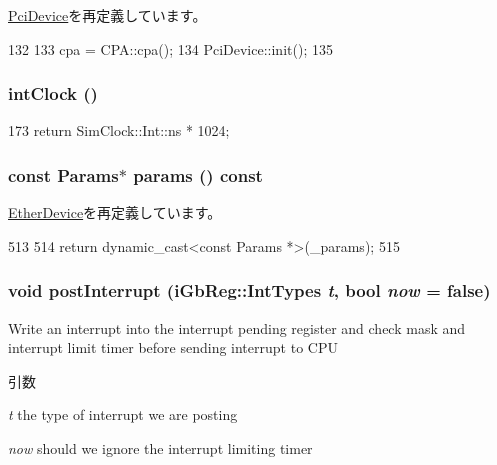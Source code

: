 \hyperlink{classPciDevice_a02fd73d861ef2e4aabb38c0c9ff82947}{PciDevice}を再定義しています。


\begin{DoxyCode}
132 {
133     cpa = CPA::cpa();
134     PciDevice::init();
135 }
\end{DoxyCode}
\hypertarget{classIGbE_ad4b9fb8ece2ddee6cda2b12e4f77b3d1}{
\subsubsection[{intClock}]{ intClock ()}}
\label{classIGbE_ad4b9fb8ece2ddee6cda2b12e4f77b3d1}



\begin{DoxyCode}
173 { return SimClock::Int::ns * 1024; }
\end{DoxyCode}
\hypertarget{classIGbE_acd3c3feb78ae7a8f88fe0f110a718dff}{
\subsubsection[{params}]{\setlength{\rightskip}{0pt plus 5cm}const {\bf Params}$\ast$ params () const}}
\label{classIGbE_acd3c3feb78ae7a8f88fe0f110a718dff}


\hyperlink{classEtherDevice_acd3c3feb78ae7a8f88fe0f110a718dff}{EtherDevice}を再定義しています。


\begin{DoxyCode}
513                    {
514         return dynamic_cast<const Params *>(_params);
515     }
\end{DoxyCode}
\hypertarget{classIGbE_a5421bafb8503ffca04cac20d616ae4cc}{
\subsubsection[{postInterrupt}]{\setlength{\rightskip}{0pt plus 5cm}void postInterrupt ({\bf iGbReg::IntTypes} {\em t}, \/  bool {\em now} = {\ttfamily false})}}
\label{classIGbE_a5421bafb8503ffca04cac20d616ae4cc}
Write an interrupt into the interrupt pending register and check mask and interrupt limit timer before sending interrupt to CPU 
\begin{DoxyParams}{引数}
\item[{\em t}]the type of interrupt we are posting \item[{\em now}]should we ignore the interrupt limiting timer \end{DoxyParams}



